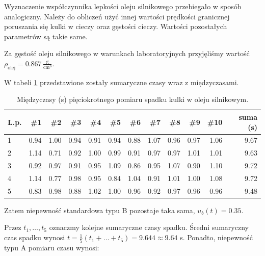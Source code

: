 \documentclass[a4paper]{article}
\begin{document}
Wyznaczenie współczynnika lepkości oleju silnikowego przebiegało w sposób analogiczny.
Należy do obliczeń użyć innej wartości prędkości granicznej poruszania się kulki w cieczy oraz gęstości cieczy.
Wartości pozostałych parametrów są takie same.

Za gęstość oleju silnikowego w warunkach laboratoryjnych przyjęliśmy wartość $\rho_\text{olej} = 0.867 \, \frac{\text{g}}{\text{cm}^3}$.

W tabeli \ref{olej} przedstawione zostały sumaryczne czasy wraz z międzyczasami.

\begin{table}[h!]
	\centering
	\begin{tabular}{lrrrrrrrrrrr}
		\toprule
		L.p. &  \#1 &  \#2 &  \#3 &  \#4 &  \#5 &  \#6 &  \#7 &  \#8 &  \#9 &  \#10 & suma (s)\\
		\midrule
		1 &           0.94 &           1.00 &           0.94 &           0.91 &           0.94 &           0.88 &           1.07 &           0.96 &           0.97 &            1.06 & 9.67 \\
		2 &           1.14 &           0.71 &           0.92 &           1.00 &           0.99 &           0.91 &           0.97 &           0.97 &           1.01 &            1.01 & 9.63 \\
		3 &           0.92 &           0.97 &           0.91 &           0.95 &           1.09 &           0.86 &           0.95 &           1.07 &           0.90 &            1.10 & 9.72 \\
		4 &           1.14 &           0.77 &           0.98 &           0.95 &           0.84 &           1.04 &           0.91 &           1.01 &           1.00 &            1.08 & 9.72 \\
		5 &           0.83 &           0.98 &           0.88 &           1.02 &           1.00 &           0.96 &           0.92 &           0.97 &           0.96 &            0.96 & 9.48 \\
		\bottomrule
		\end{tabular}
	\caption{Międzyczasy (s) pięciokrotnego pomiaru spadku kulki w oleju silnikowym.}
	\label{olej}
\end{table}

Zatem niepewność standardowa typu B pozostaje taka sama, $u_b(t) = 0.35$.

Przez $t_1, \dots, t_5$ oznaczmy kolejne sumaryczne czasy spadku.
Średni sumaryczny czas spadku wynosi $t = \frac 1 5 (t_1 + \dots + t_5) = 9.644 \approx 9.64$ s.
Ponadto, niepewność typu A pomiaru czasu wynosi:
\end{document}

